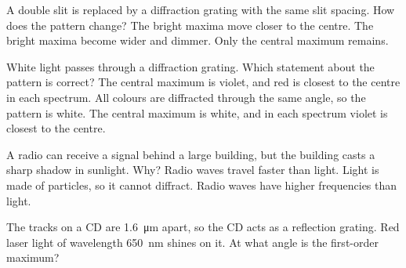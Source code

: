 \begin{quizq}{}
A double slit is replaced by a diffraction grating with the same slit spacing. How does the pattern
change?
  {The bright maxima move closer to the centre.}
  {The bright maxima become wider and dimmer.}
  {Only the central maximum remains.}
\end{quizq}

\begin{quizq}{}
White light passes through a diffraction grating. Which statement about the pattern is correct?
  {The central maximum is violet, and red is closest to the centre in each spectrum.}
  {All colours are diffracted through the same angle, so the pattern is white.}
  {The central maximum is white, and in each spectrum violet is closest to the centre.}
\end{quizq}

\begin{quizq}{}
A radio can receive a signal behind a large building, but the building casts a sharp shadow in sunlight.
Why?
  {Radio waves travel faster than light.}
  {Light is made of particles, so it cannot diffract.}
  {Radio waves have higher frequencies than light.}
\end{quizq}

\begin{quizq}{}
The tracks on a CD are \qty{1.6}{\micro m} apart, so the CD acts as a reflection grating. Red laser light of
wavelength \qty{650}{nm} shines on it. At what angle is the first-order maximum?
\end{quizq}
